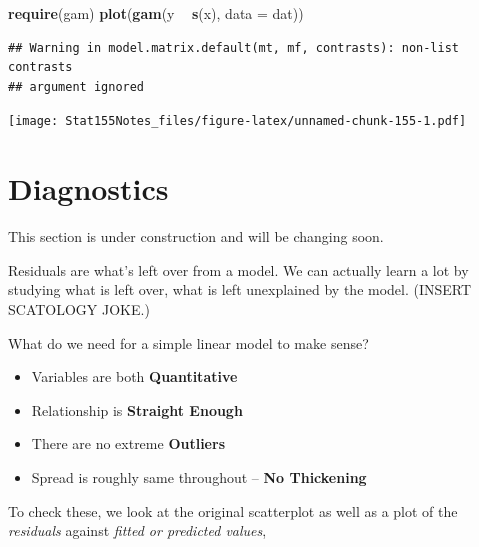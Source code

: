 \documentclass[]{book}
\newenvironment{Shaded}{\begin{snugshade}}{\end{snugshade}}
\newcommand{\DataTypeTok}[1]{\textcolor[rgb]{0.13,0.29,0.53}{#1}}
\newcommand{\DecValTok}[1]{\textcolor[rgb]{0.00,0.00,0.81}{#1}}
\newcommand{\KeywordTok}[1]{\textcolor[rgb]{0.13,0.29,0.53}{\textbf{#1}}}
\newcommand{\NormalTok}[1]{#1}
\newcommand{\OperatorTok}[1]{\textcolor[rgb]{0.81,0.36,0.00}{\textbf{#1}}}
\newcommand{\OtherTok}[1]{\textcolor[rgb]{0.56,0.35,0.01}{#1}}
\newcommand{\StringTok}[1]{\textcolor[rgb]{0.31,0.60,0.02}{#1}}
\begin{document}
\begin{Shaded}
\begin{Highlighting}[]
\KeywordTok{require}\NormalTok{(gam)}
\KeywordTok{plot}\NormalTok{(}\KeywordTok{gam}\NormalTok{(y }\OperatorTok{~}\StringTok{ }\KeywordTok{s}\NormalTok{(x), }\DataTypeTok{data =}\NormalTok{ dat))}
\end{Highlighting}
\end{Shaded}

\begin{verbatim}
## Warning in model.matrix.default(mt, mf, contrasts): non-list contrasts
## argument ignored
\end{verbatim}

\texttt{[image: Stat155Notes\_files/figure-latex/unnamed-chunk-155-1.pdf]}

\hypertarget{diagnostics}{%
\section{Diagnostics}\label{diagnostics}}

{
This section is under construction and will be changing soon.
}

Residuals are what's left over from a model. We can actually learn a lot by studying what is left over, what is left unexplained by the model. (INSERT SCATOLOGY JOKE.)

What do we need for a simple linear model to make sense?

\begin{itemize}
\item
  Variables are both \textbf{Quantitative}
\item
  Relationship is \textbf{Straight Enough}
\item
  There are no extreme \textbf{Outliers}
\item
  Spread is roughly same throughout -- \textbf{No Thickening}
\end{itemize}

To check these, we look at the original scatterplot as well as a plot of the \emph{residuals} against \emph{fitted or predicted values},

\begin{Shaded}
\end{Shaded}
\end{document}
